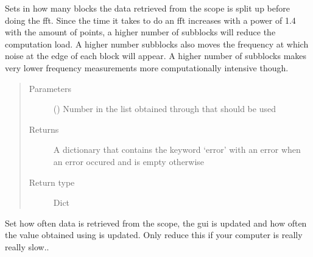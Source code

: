 \documentclass[letterpaper,10pt,english]{sphinxmanual}
\begin{document}
\begin{fulllineitems}
\begin{fulllineitems}
\label{\detokenize{index:TiePieLCR_settings.TiePieLCR_settings.set_sub_blocks}}
\sphinxAtStartPar
Sets in how many blocks the data retrieved from the scope is split up before doing the fft. Since the time it takes to do an fft increases with a power of 1.4 with the amount of points, a higher number of sub\sphinxhyphen{}blocks will reduce the computation load. A higher number sub\sphinxhyphen{}blocks also moves the frequency at which noise at the edge of each block will appear. A higher number of sub\sphinxhyphen{}blocks makes very lower frequency measurements more computationally intensive though.
\begin{quote}\begin{description}
\item[{Parameters}] \leavevmode
\sphinxAtStartPar
{} () \textendash{} Number in the list obtained through {\hyperref[\detokenize{index:TiePieLCR_settings.TiePieLCR_settings.get_sub_blocks_list}]{}} that should be used

\item[{Returns}] \leavevmode
\sphinxAtStartPar
A dictionary that contains the keyword ‘error’ with an error when an error occured and is empty otherwise

\item[{Return type}] \leavevmode
\sphinxAtStartPar
Dict

\end{description}\end{quote}

\end{fulllineitems}


\begin{fulllineitems}
\label{\detokenize{index:TiePieLCR_settings.TiePieLCR_settings.set_update_freq}}
\sphinxAtStartPar
Set how often data is retrieved from the scope, the gui is updated and how often the value obtained using  is updated. Only reduce this if your computer is really really slow..


\end{fulllineitems}
\end{fulllineitems}
\end{document}

